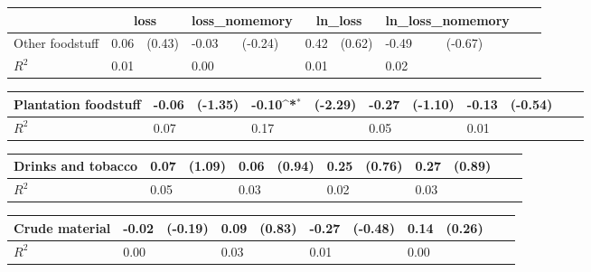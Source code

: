 \def\sym#1{\ifmmode^{#1}\else\(^{#1}\)\fi}
\begin{tabular}{p{4cm} p{1.4cm} p{1.2cm} p{1.5cm}  p{1.5cm} p{1.4cm} p{1.2cm} p{1.5cm} p{1.5cm}  p{1.5cm} p{1.5cm} }
                &\multicolumn{2}{c}{loss}    &\multicolumn{2}{c}{loss\_nomemory}&\multicolumn{2}{c}{ln\_loss} &\multicolumn{2}{c}{ln\_loss\_nomemory}\\
\hline
Other foodstuff &     0.06         &   (0.43)&    -0.03         &  (-0.24)&     0.42         &   (0.62)&    -0.49         &  (-0.67)\\
\hline
\(R^{2}\)       &     0.01         &         &     0.00         &         &     0.01         &         &     0.02         &         \\
\end{tabular}
\def\sym#1{\ifmmode^{#1}\else\(^{#1}\)\fi}
\begin{tabular}{p{4cm} p{1.4cm} p{1.2cm} p{1.5cm}  p{1.5cm} p{1.4cm} p{1.2cm} p{1.5cm} p{1.5cm}  p{1.5cm} p{1.5cm} }
\hline
Plantation foodstuff&    -0.06         &  (-1.35)&    -0.10\sym{*}  &  (-2.29)&    -0.27         &  (-1.10)&    -0.13         &  (-0.54)\\
\hline
\(R^{2}\)       &     0.07         &         &     0.17         &         &     0.05         &         &     0.01         &         \\
\end{tabular}
\def\sym#1{\ifmmode^{#1}\else\(^{#1}\)\fi}
\begin{tabular}{p{4cm} p{1.4cm} p{1.2cm} p{1.5cm}  p{1.5cm} p{1.4cm} p{1.2cm} p{1.5cm} p{1.5cm}  p{1.5cm} p{1.5cm} }
\hline
Drinks and tobacco&     0.07         &   (1.09)&     0.06         &   (0.94)&     0.25         &   (0.76)&     0.27         &   (0.89)\\
\hline
\(R^{2}\)       &     0.05         &         &     0.03         &         &     0.02         &         &     0.03         &         \\
\end{tabular}
\def\sym#1{\ifmmode^{#1}\else\(^{#1}\)\fi}
\begin{tabular}{p{4cm} p{1.4cm} p{1.2cm} p{1.5cm}  p{1.5cm} p{1.4cm} p{1.2cm} p{1.5cm} p{1.5cm}  p{1.5cm} p{1.5cm} }
\hline
Crude material  &    -0.02         &  (-0.19)&     0.09         &   (0.83)&    -0.27         &  (-0.48)&     0.14         &   (0.26)\\
\hline
\(R^{2}\)       &     0.00         &         &     0.03         &         &     0.01         &         &     0.00         &         \\
\end{tabular}
